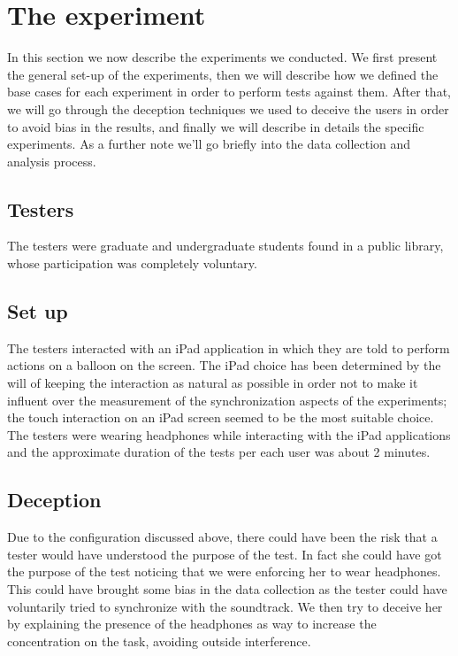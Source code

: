 \section{The experiment}
In this section we now describe the experiments we conducted.
We first present the general set-up of the experiments, then we will describe how we defined the base cases for each experiment in order to perform tests against them.
After that, we will go through the deception techniques we used to deceive the users in order to avoid bias in the results, and finally we will describe in details the specific experiments.
As a further note we'll go briefly into the data collection and analysis process.

\subsection{Testers}
The testers were graduate and undergraduate students found in a public library, whose participation was completely voluntary.

\subsection{Set up}
The testers interacted with an iPad application in which they are told to perform actions on a balloon on the screen. The iPad choice has been determined by the will of keeping the interaction as natural as possible in order not to make it influent over the measurement of the synchronization aspects of the experiments; the touch interaction on an iPad screen seemed to be the most suitable choice.
The testers were wearing headphones while interacting with the iPad applications and the approximate duration of the tests per each user was about 2 minutes.

\subsection{Deception}
Due to the configuration discussed above, there could have been the risk that a tester would have understood the purpose of the test. In fact she could have got the purpose of the test noticing that we were enforcing her to wear headphones. This could have brought some bias in the data collection as the tester could have voluntarily tried to synchronize with the soundtrack.
We then try to deceive her by explaining the presence of the headphones as way to increase the concentration on the task, avoiding outside interference.

